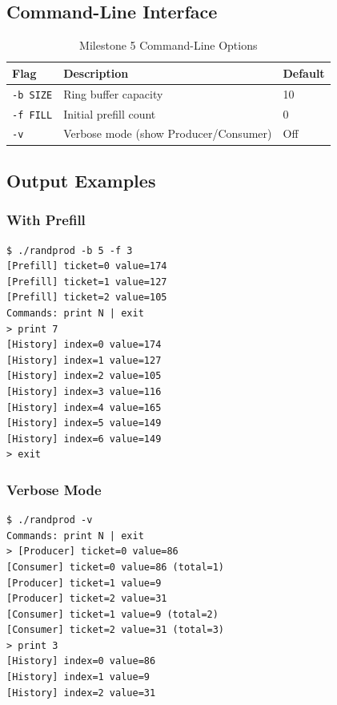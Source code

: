 \documentclass[12pt,a4paper]{article}
\begin{document}
\subsection{Command-Line Interface}

\begin{table}[H]
\centering
\caption{Milestone 5 Command-Line Options}
\begin{tabular}{@{}lll@{}}
\toprule
\textbf{Flag} & \textbf{Description} & \textbf{Default} \\ \midrule
\texttt{-b SIZE} & Ring buffer capacity & 10 \\
\texttt{-f FILL} & Initial prefill count & 0 \\
\texttt{-v} & Verbose mode (show Producer/Consumer) & Off \\ \bottomrule
\end{tabular}
\end{table}

\subsection{Output Examples}

\subsubsection{With Prefill}
\begin{tcolorbox}[colback=green!5!white,colframe=green!75!black,title=Example: \texttt{./randprod -b 5 -f 3}]
\begin{verbatim}
$ ./randprod -b 5 -f 3
[Prefill] ticket=0 value=174
[Prefill] ticket=1 value=127
[Prefill] ticket=2 value=105
Commands: print N | exit
> print 7
[History] index=0 value=174
[History] index=1 value=127
[History] index=2 value=105
[History] index=3 value=116
[History] index=4 value=165
[History] index=5 value=149
[History] index=6 value=149
> exit
\end{verbatim}
\end{tcolorbox}

\subsubsection{Verbose Mode}
\begin{tcolorbox}[colback=green!5!white,colframe=green!75!black,title=Example: \texttt{./randprod -v}]
\begin{verbatim}
$ ./randprod -v
Commands: print N | exit
> [Producer] ticket=0 value=86
[Consumer] ticket=0 value=86 (total=1)
[Producer] ticket=1 value=9
[Producer] ticket=2 value=31
[Consumer] ticket=1 value=9 (total=2)
[Consumer] ticket=2 value=31 (total=3)
> print 3
[History] index=0 value=86
[History] index=1 value=9
[History] index=2 value=31
\end{verbatim}
\end{tcolorbox}
\end{document}
